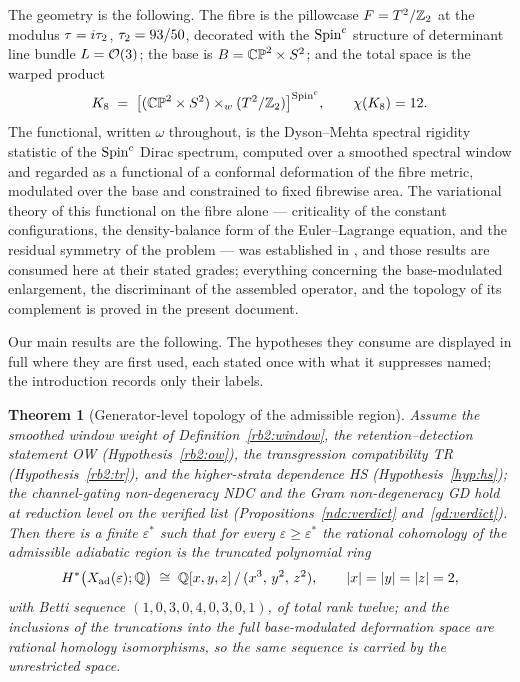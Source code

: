 \documentclass[11pt]{article}
\numberwithin{equation}{section}
\theoremstyle{plain}
\newtheorem{theorem}{Theorem}[section]
\theoremstyle{definition}
\theoremstyle{remark}
\newcommand{\Xad}{X_{\mathrm{ad}}}
\begin{document}
The geometry is the following. The fibre is the pillowcase
$F = T^2/\mathbb{Z}_2$ at the modulus $\tau = i\tau_2$,
$\tau_2 = 93/50$, decorated with the $\text{Spin}^c$ structure of
determinant line bundle $L = \mathcal{O}(3)$; the base is
$B = \mathbb{CP}^2 \times S^2$; and the total space is the warped
product
\begin{equation}\label{eq:K8}
K_8 \;=\; \bigl[(\mathbb{CP}^2 \times S^2) \times_{w}
(T^2/\mathbb{Z}_2)\bigr]^{\text{Spin}^c},
\qquad \chi(K_8) = 12 .
\end{equation}
The functional, written $\omega$ throughout, is the Dyson--Mehta
spectral rigidity statistic \cite{DysonMehta1963} of the $\text{Spin}^c$
Dirac spectrum, computed over a smoothed spectral window and
regarded as a functional of a conformal deformation of the fibre
metric, modulated over the base and constrained to fixed fibrewise
area. The variational theory of this functional on the fibre alone
--- criticality of the constant configurations, the
density-balance form of the Euler--Lagrange equation, and the
residual symmetry of the problem --- was established in
\cite{MEF3}, and those results are consumed here at their stated
grades; everything concerning the base-modulated enlargement, the
discriminant of the assembled operator, and the topology of its
complement is proved in the present document.

Our main results are the following. The hypotheses they consume
are displayed in full where they are first used, each stated once
with what it suppresses named; the introduction records only their
labels.

\begin{theorem}[Generator-level topology of the admissible
region]\label{thm:A}
Assume the smoothed window weight of
Definition~\textup{\ref{rb2:window}}, the retention--detection
statement OW \textup{(Hypothesis~\ref{rb2:ow})}, the transgression
compatibility TR \textup{(Hypothesis~\ref{rb2:tr})}, and the
higher-strata dependence HS \textup{(Hypothesis~\ref{hyp:hs})}; the
channel-gating non-degeneracy NDC and the Gram non-degeneracy GD
hold at reduction level on the verified list
\textup{(Propositions~\ref{ndc:verdict} and~\ref{gd:verdict})}.
Then there is a finite
$\varepsilon^{*}$ such that for every
$\varepsilon \geq \varepsilon^{*}$ the rational cohomology of the
admissible adiabatic region is the truncated polynomial ring
\[
H^{*}\bigl(\Xad(\varepsilon); \Q\bigr) \;\cong\;
\Q[x, y, z]\,/\,(x^{3},\, y^{2},\, z^{2}),
\qquad |x| = |y| = |z| = 2,
\]
with Betti sequence $(1, 0, 3, 0, 4, 0, 3, 0, 1)$, of total rank
twelve; and the inclusions of the truncations into the full
base-modulated deformation space are rational homology
isomorphisms, so the same sequence is carried by the unrestricted
space.
\end{theorem}
\end{document}
